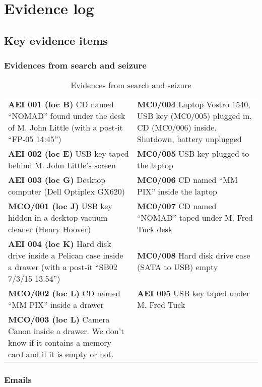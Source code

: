\section{Evidence log}
\subsection{Key evidence items}
\subsubsection{Evidences from search and seizure}
\begin{table}[H]
    \centering
    \begin{tabularx}{.9\textwidth}{|X|X|}
	\heading{\textbf{M. John Little}} & \heading{\textbf{M. Fred Tuck}}\\\hline
	\textbf{AEI 001 (loc B)} CD named \enquote{NOMAD} found under the desk of M. John Little (with a post-it \enquote{FP-05 14:45}) & \textbf{MC0/004} Laptop Vostro 1540, USB key (MC0/005) plugged in, CD (MC0/006) inside. Shutdown, battery unplugged\\\hline
	\textbf{AEI 002 (loc E)} USB key taped behind M. John Little's screen & \textbf{MC0/005} USB key plugged to the laptop\\\hline
	\textbf{AEI 003 (loc G)} Desktop computer (Dell Optiplex GX620) & \textbf{MC0/006} CD named \enquote{MM PIX} inside the laptop\\\hline
	\textbf{MCO/001 (loc J)} USB key hidden in a desktop vacuum cleaner (Henry Hoover) & \textbf{MC0/007} CD named \enquote{NOMAD} taped under M. Fred Tuck desk\\\hline
	\textbf{AEI 004 (loc K)} Hard disk drive inside a Pelican case inside a drawer (with a post-it \enquote{SB02 7/3/15 13.54}) & \textbf{MC0/008} Hard disk drive case (SATA to USB) empty\\\hline
	\textbf{MCO/002 (loc L)} CD named \enquote{MM PIX} inside a drawer & \textbf{AEI 005} USB key taped under M. Fred Tuck\\\hline
	\textbf{MCO/003 (loc L)} Camera Canon inside a drawer. We don't know if it contains a memory card and if it is empty or not. & \\\hline
    \end{tabularx}
    \caption{Evidences from search and seizure}
\end{table}
\subsubsection{Emails}
